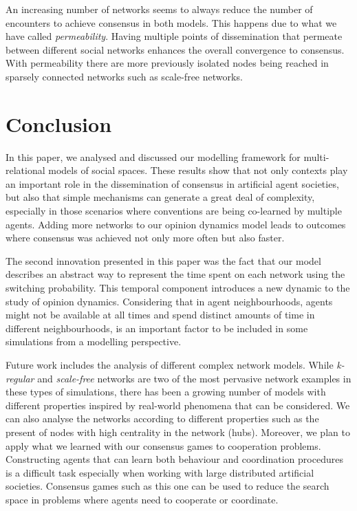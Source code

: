 \documentclass[preprint,number]{elsarticle}
\begin{document}
An increasing number of networks seems to always reduce the number of encounters to achieve consensus in both models. This happens due to what we have called \textit{permeability}. Having multiple points of dissemination that permeate between different social networks enhances the overall convergence to consensus. With permeability there are more previously isolated nodes being reached in sparsely connected networks such as scale-free networks. 

\section{Conclusion}
\label{sec:conclusion-future}
In this paper, we analysed and discussed our modelling framework for multi-relational models of social spaces. These results show that not only contexts play an important role in the dissemination of consensus in artificial agent societies, but also that simple mechanisms can generate a great deal of complexity, especially in those scenarios where conventions are being co-learned by multiple agents. Adding more networks to our opinion dynamics model leads to outcomes where consensus was achieved not only more often but also faster.

The second innovation presented in this paper was the fact that our model describes an abstract way to represent the time spent on each network using the switching probability. This temporal component introduces a new dynamic to the study of opinion dynamics. Considering that in agent neighbourhoods, agents might not be available at all times and spend distinct amounts of time in different neighbourhoods, is an important factor to be included in some simulations from a modelling perspective. 

Future work includes the analysis of different complex network models. While \textit{k-regular} and \textit{scale-free} networks are two of the most pervasive network examples in these types of simulations, there has been a growing number of models with different properties inspired by real-world phenomena that can be considered. We can also analyse the networks according to different properties such as the present of nodes with high centrality in the network (hubs). Moreover, we  plan to apply what we learned with our consensus games to cooperation problems. Constructing agents that can learn both behaviour and coordination procedures is a difficult task especially when working with large distributed artificial societies. Consensus games such as this one can be used to reduce the search space in problems where agents need to cooperate or coordinate.
\end{document}
